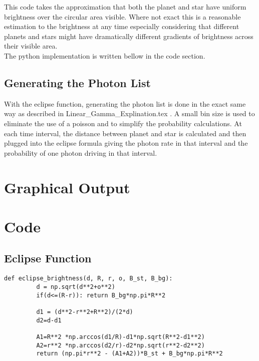 \documentclass[aps,letterpaper,10pt]{revtex4}
\begin{document}
This code takes the approximation that both the planet and star have uniform brightness over the circular area visible. Where not exact this is a reasonable estimation to the brightness at any time especially considering that different planets and stars might have dramatically different gradients of brightness across their visible area.\\

The python implementation is written bellow in the code section.

\vspace{3mm}

\subsection{Generating the Photon List}
With the eclipse function, generating the photon list is done in the exact same way as described in Linear\_Gamma\_Explination.tex . A small bin size is used to eliminate the use of a poisson and to simplify the probability calculations. At each time interval, the distance between planet and star is calculated and then plugged into the eclipse formula giving the photon rate in that interval and the probability of one photon driving in that interval.



\vspace{3mm} 

\section{Graphical Output}

\begin{figure}[h!]
\vspace{3mm}
\end{figure}


\section{Code}
\subsection{Eclipse Function}

\begin{verbatim}
def eclipse_brightness(d, R, r, o, B_st, B_bg):
         d = np.sqrt(d**2+o**2)
         if(d<=(R-r)): return B_bg*np.pi*R**2
	
         d1 = (d**2-r**2+R**2)/(2*d)
         d2=d-d1
	
         A1=R**2 *np.arccos(d1/R)-d1*np.sqrt(R**2-d1**2)
         A2=r**2 *np.arccos(d2/r)-d2*np.sqrt(r**2-d2**2)
         return (np.pi*r**2 - (A1+A2))*B_st + B_bg*np.pi*R**2
\end{verbatim}
\end{document}

